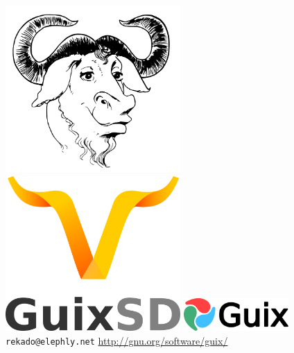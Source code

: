 \documentclass{beamer}
\begin{document}
\begin{frame}{}
\hfill{
  \includegraphics[width=0.5\textwidth]{images/gnuhead}
  \includegraphics[width=0.5\textwidth]{images/guixsd-logo}}
\vfill{
  \hfill{\includegraphics[width=0.3\textwidth]{images/guix-logo}}\\[0.2cm]
  \texttt{rekado@elephly.net} \hfill{\alert{\url{http://gnu.org/software/guix/}}}
}

\end{frame}
\end{document}
